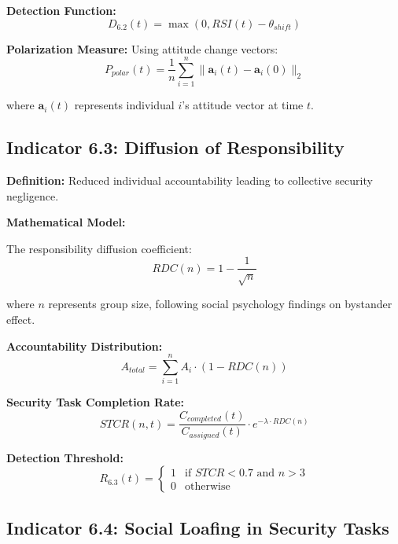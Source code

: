 \documentclass[11pt,a4paper]{article}
\begin{document}
\textbf{Detection Function:}
\begin{equation}
D_{6.2}(t) = \max(0, RSI(t) - \theta_{shift})
\end{equation}

\textbf{Polarization Measure:}
Using attitude change vectors:
\begin{equation}
P_{polar}(t) = \frac{1}{n}\sum_{i=1}^n \|\mathbf{a}_i(t) - \mathbf{a}_i(0)\|_2
\end{equation}

where $\mathbf{a}_i(t)$ represents individual $i$'s attitude vector at time $t$.

\subsection{Indicator 6.3: Diffusion of Responsibility}

\textbf{Definition:} Reduced individual accountability leading to collective security negligence.

\textbf{Mathematical Model:}

The responsibility diffusion coefficient:
\begin{equation}
RDC(n) = 1 - \frac{1}{\sqrt{n}}
\end{equation}

where $n$ represents group size, following social psychology findings on bystander effect.

\textbf{Accountability Distribution:}
\begin{equation}
A_{total} = \sum_{i=1}^n A_i \cdot (1 - RDC(n))
\end{equation}

\textbf{Security Task Completion Rate:}
\begin{equation}
STCR(n,t) = \frac{C_{completed}(t)}{C_{assigned}(t)} \cdot e^{-\lambda \cdot RDC(n)}
\end{equation}

\textbf{Detection Threshold:}
\begin{equation}
R_{6.3}(t) = \begin{cases}
1 & \text{if } STCR < 0.7 \text{ and } n > 3 \\
0 & \text{otherwise}
\end{cases}
\end{equation}

\subsection{Indicator 6.4: Social Loafing in Security Tasks}
\end{document}
